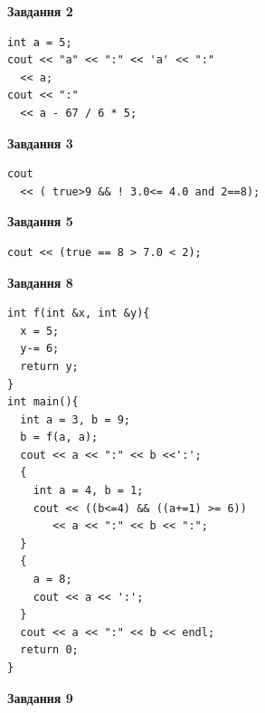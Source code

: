 \documentclass[12pt, ukrainian]{article}
\begin{document}
{\begin {large}
\begin{minipage}[t]{7.0cm}
\end{minipage}
\vline \hspace{1mm}
\begin{minipage}[t]{11.0cm}

\begin{center}
\textbf{Завдання 2}
\end{center}
\vspace{-8mm}

\begin{verbatim}
int a = 5;
cout << "a" << ":" << 'a' << ":" 
  << a;
cout << ":" 
  << a - 67 / 6 * 5;
\end{verbatim}



\begin{center}
\textbf{Завдання 3}
\end{center}
\vspace{-8mm}

\begin{verbatim}
cout 
  << ( true>9 && ! 3.0<= 4.0 and 2==8);
\end{verbatim}



\begin{center}
\textbf{Завдання 5}
\end{center}
\vspace{-8mm}

\begin{verbatim}
cout << (true == 8 > 7.0 < 2);
\end{verbatim}



\begin{center}
\textbf{Завдання 8}
\end{center}
\vspace{-8mm}

\begin{verbatim}
int f(int &x, int &y){
  x = 5;
  y-= 6;
  return y;
}
int main(){
  int a = 3, b = 9;
  b = f(a, a);
  cout << a << ":" << b <<':';
  {
    int a = 4, b = 1;
    cout << ((b<=4) && ((a+=1) >= 6))
       << a << ":" << b << ":";
  }
  {
    a = 8;
    cout << a << ':';
  }
  cout << a << ":" << b << endl;
  return 0;
}
\end{verbatim}

\end{minipage}


\begin{minipage}[t]{7.0cm}

\begin{center}
\textbf{Завдання 9}
\end{center}
\vspace{-8mm}


\end{minipage}
\end{large}}
\end{document}

